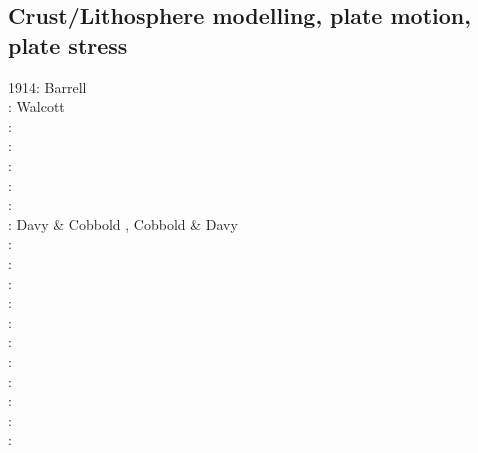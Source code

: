 \subsection{Crust/Lithosphere modelling, plate motion, plate stress}

\begin{scriptsize}
1914: Barrell \cite{barr14}\\
\nineteenseventy: Walcott \cite{walc70} \\
\nineteenseventyseven: \cite{crou77}\\
\nineteeneightyone: \cite{brpo81}\\
\nineteeneightythree: \cite{mcja83}\\
\nineteeneightyfour: \cite{kupa84}\cite{riff84}\\
\nineteeneightysix: \cite{stbb86}\\
\nineteeneightyeight: Davy \& Cobbold \cite{daco88}, Cobbold \& Davy \cite{coda88}\\
\nineteeneightynine: \cite{jabe89}\\
\nineteenninety: \cite{chmo90}\\
\nineteenninetyone: \cite{chbv91}\cite{daco91}\\
\nineteenninetytwo: \cite{moln92}\cite{budi92}\cite{kigw92}\\
\nineteenninetythree: \cite{nefo93}\cite{brau93}\cite{grma93}\cite{berc93}\\
\nineteenninetyfour: \cite{buso94}\cite{befh94}\\
\nineteenninetyfive: \cite{belg95}\cite{brbe95}\cite{kian95}\cite{budi95}\cite{elfb95}\cite{zhgu95b}\\
\nineteenninetysix: \cite{bekh96}\cite{berc96}\cite{jabh96}\\
\nineteenninetyseven: \cite{thsj97}\cite{babr97}\cite{bucl97}\cite{mole97}\\
\nineteenninetyeight: \cite{bird98}\cite{lecd98}\cite{kian98}\cite{mafs98}\cite{madu98}\cite{gumm98}\cite{berc98}\cite{madu98}\\
\nineteenninetynine: \cite{will99b}\cite{bird99}\cite{clbp99}\cite{fugo99}\cite{mole99}\cite{lemo99}\cite{gebp99}\\

\end{scriptsize}

